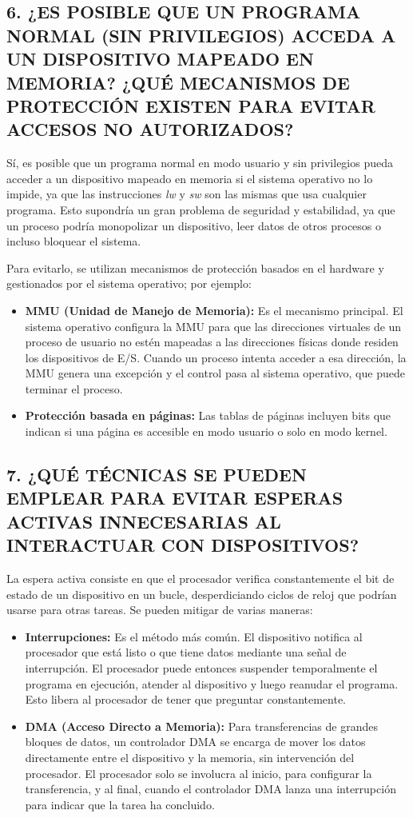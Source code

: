 \documentclass[12pt]{article}
\begin{document}
\subsection*{6. ¿ES POSIBLE QUE UN PROGRAMA NORMAL (SIN PRIVILEGIOS) ACCEDA A UN DISPOSITIVO MAPEADO EN MEMORIA? ¿QUÉ MECANISMOS DE PROTECCIÓN EXISTEN PARA EVITAR ACCESOS NO AUTORIZADOS?}

Sí, es posible que un programa normal en modo usuario y sin privilegios pueda acceder a un dispositivo mapeado en memoria si el sistema operativo no lo impide, ya que las instrucciones \textit{lw} y \textit{sw} son las mismas que usa cualquier programa. Esto supondría un gran problema de seguridad y estabilidad, ya que un proceso podría monopolizar un dispositivo, leer datos de otros procesos o incluso bloquear el sistema.

Para evitarlo, se utilizan mecanismos de protección basados en el hardware y gestionados por el sistema operativo; por ejemplo:
\begin{itemize}
    \item \textbf{MMU (Unidad de Manejo de Memoria):} Es el mecanismo principal. El sistema operativo configura la MMU para que las direcciones virtuales de un proceso de usuario no estén mapeadas a las direcciones físicas donde residen los dispositivos de E/S. Cuando un proceso intenta acceder a esa dirección, la MMU genera una excepción y el control pasa al sistema operativo, que puede terminar el proceso.
    \item \textbf{Protección basada en páginas:} Las tablas de páginas incluyen bits que indican si una página es accesible en modo usuario o solo en modo kernel.
\end{itemize}

\subsection*{7. ¿QUÉ TÉCNICAS SE PUEDEN EMPLEAR PARA EVITAR ESPERAS ACTIVAS INNECESARIAS AL INTERACTUAR CON DISPOSITIVOS?}

La espera activa consiste en que el procesador verifica constantemente el bit de estado de un dispositivo en un bucle, desperdiciando ciclos de reloj que podrían usarse para otras tareas. Se pueden mitigar de varias maneras:
\begin{itemize}
    \item \textbf{Interrupciones:} Es el método más común. El dispositivo notifica al procesador que está listo o que tiene datos mediante una señal de interrupción. El procesador puede entonces suspender temporalmente el programa en ejecución, atender al dispositivo y luego reanudar el programa. Esto libera al procesador de tener que preguntar constantemente.
    \item \textbf{DMA (Acceso Directo a Memoria):} Para transferencias de grandes bloques de datos, un controlador DMA se encarga de mover los datos directamente entre el dispositivo y la memoria, sin intervención del procesador. El procesador solo se involucra al inicio, para configurar la transferencia, y al final, cuando el controlador DMA lanza una interrupción para indicar que la tarea ha concluido.
\end{itemize}
\end{document}
